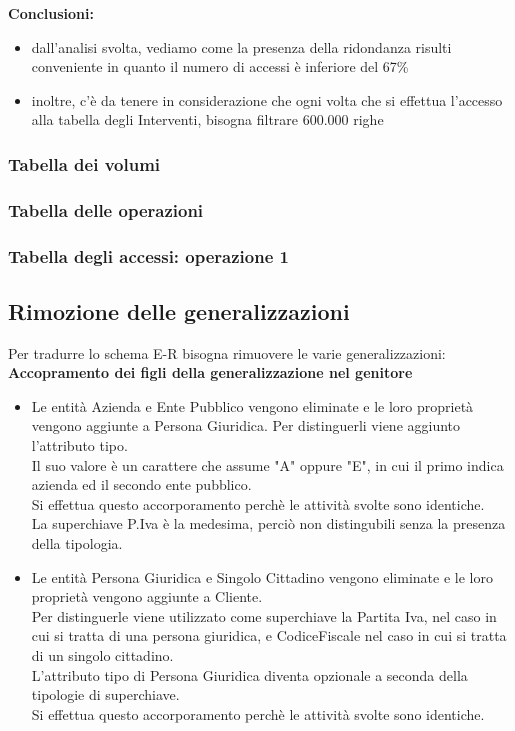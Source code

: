 \documentclass[legalpaper]{article}
\begin{document}
	\textbf{Conclusioni:}
	\begin{itemize}
		\item dall'analisi svolta, vediamo come la presenza della ridondanza risulti conveniente in quanto il numero di accessi è inferiore del 67\%
		\item inoltre, c'è da tenere in considerazione che ogni volta che si effettua l'accesso alla tabella degli Interventi, bisogna filtrare 600.000 righe
	\end{itemize}
	


\subsubsection{Tabella dei volumi}
\subsubsection{Tabella delle operazioni}
\subsubsection{Tabella degli accessi: operazione 1}

\subsection{Rimozione delle generalizzazioni}
Per tradurre lo schema E-R bisogna rimuovere le varie generalizzazioni:\\
\newline
\textbf{Accopramento dei figli della generalizzazione nel genitore}
\begin{itemize}
	\item Le entità Azienda e Ente Pubblico vengono eliminate e le loro proprietà vengono aggiunte a Persona Giuridica. Per distinguerli viene aggiunto l'attributo tipo. \\Il suo valore è un carattere che assume "A" oppure "E", in cui il primo indica azienda ed il secondo ente pubblico.\\
	Si effettua questo accorporamento perchè le attività svolte sono identiche. \\La superchiave P.Iva è la medesima, perciò non distingubili senza la presenza della tipologia.
	\item Le entità Persona Giuridica e Singolo Cittadino vengono eliminate e le loro proprietà vengono aggiunte a Cliente. \\Per distinguerle viene utilizzato come superchiave la Partita Iva, nel caso in cui si tratta di una persona giuridica, e CodiceFiscale nel caso in cui si tratta di un singolo cittadino.\\ L'attributo tipo di Persona Giuridica diventa opzionale a seconda della tipologie di superchiave.\\
	Si effettua questo accorporamento perchè le attività svolte sono identiche.
\end{itemize}
\end{document}
